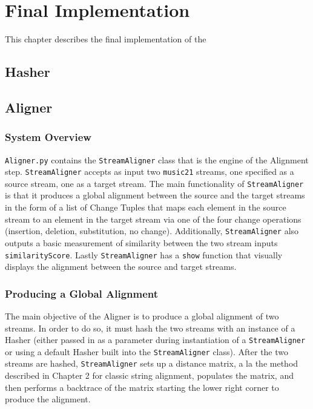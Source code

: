 \chapter{Final Implementation}
This chapter describes the final implementation of the 

\section{Hasher}


\section{Aligner}
\subsection{System Overview}
\texttt{Aligner.py} contains the \texttt{StreamAligner} class that is the engine of the Alignment step. \texttt{StreamAligner} accepts as input two \texttt{music21} streams, one specified as a source stream, one as a target stream. The main functionality of \texttt{StreamAligner} is that it produces a global alignment between the source and the target streams in the form of a list of Change Tuples that maps each element in the source stream to an element in the target stream via one of the four change operations (insertion, deletion, substitution, no change). Additionally, \texttt{StreamAligner} also outputs a basic measurement of similarity between the two stream inputs \texttt{similarityScore}. Lastly \texttt{StreamAligner} has a \texttt{show} function that visually displays the alignment between the source and target streams. 

\subsection{Producing a Global Alignment}
The main objective of the Aligner is to produce a global alignment of two streams. In order to do so, it must hash the two streams with an instance of a Hasher (either passed in as a parameter during instantiation of a \texttt{StreamAligner} or using a default Hasher built into the \texttt{StreamAligner} class). After the two streams are hashed, \texttt{StreamAligner} sets up a distance matrix, a la the method described in Chapter 2 for classic string alignment, populates the matrix, and then performs a backtrace of the matrix starting the lower right corner to produce the alignment.

